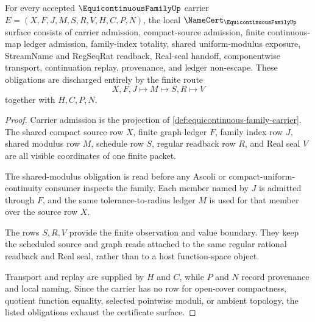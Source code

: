 \begin{theorem}
\label{thm:equicontinuous-family-namecert-obligations}
For every accepted $\EquicontinuousFamilyUp$ carrier $E=(X,F,J,M,S,R,V,H,C,P,N)$, the local $\NameCert_{\EquicontinuousFamilyUp}$ surface consists of carrier admission, compact-source admission, finite continuous-map ledger admission, family-index totality, shared uniform-modulus exposure, StreamName and RegSeqRat readback, Real-seal handoff, componentwise transport, continuation replay, provenance, and ledger non-escape. These obligations are discharged entirely by the finite route
$$
X,F,J\longmapsto M\longmapsto S,R\longmapsto V
$$
together with $H,C,P,N$.
\end{theorem}
\begin{proof}
Carrier admission is the projection of \autoref{def:equicontinuous-family-carrier}. The shared compact source row $X$, finite graph ledger $F$, family index row $J$, shared modulus row $M$, schedule row $S$, regular readback row $R$, and Real seal $V$ are all visible coordinates of one finite packet.

The shared-modulus obligation is read before any Ascoli or compact-uniform-continuity consumer inspects the family. Each member named by $J$ is admitted through $F$, and the same tolerance-to-radius ledger $M$ is used for that member over the source row $X$.

The rows $S,R,V$ provide the finite observation and value boundary. They keep the scheduled source and graph reads attached to the same regular rational readback and Real seal, rather than to a host function-space object.

Transport and replay are supplied by $H$ and $C$, while $P$ and $N$ record provenance and local naming. Since the carrier has no row for open-cover compactness, quotient function equality, selected pointwise moduli, or ambient topology, the listed obligations exhaust the certificate surface.
\end{proof}

